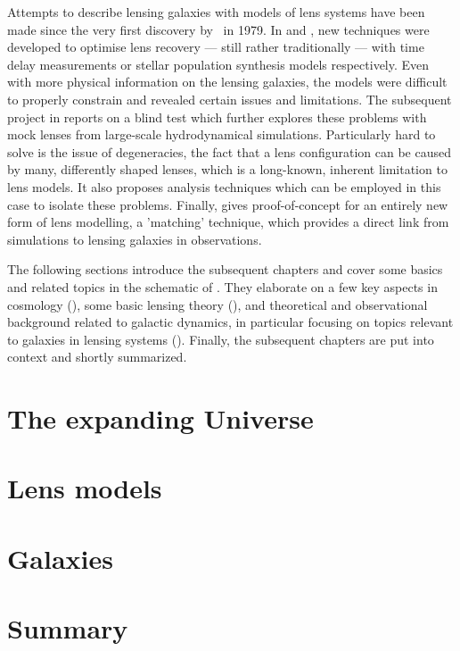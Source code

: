 Attempts to describe lensing galaxies with models of lens systems have been made
since the very first discovery by~ in 1979.  In
 and , new techniques were developed to optimise
lens recovery --- still rather traditionally --- with time delay measurements or
stellar population synthesis models respectively.  Even with more physical
information on the lensing galaxies, the models were difficult to properly
constrain and revealed certain issues and limitations.  The subsequent project
in  reports on a blind test which further explores these problems
with mock lenses from large-scale hydrodynamical simulations.  Particularly hard
to solve is the issue of degeneracies, the fact that a lens configuration can be
caused by many, differently shaped lenses, which is a long-known, inherent
limitation to lens models.  It also proposes analysis techniques which can be
employed in this case to isolate these problems.  Finally,  gives
proof-of-concept for an entirely new form of lens modelling, a 'matching'
technique, which provides a direct link from simulations to lensing galaxies in
observations.

The following sections introduce the subsequent chapters and cover some basics
and related topics in the schematic of .  They elaborate on a
few key aspects in cosmology (), some basic lensing theory
(), and theoretical and observational background related to
galactic dynamics, in particular focusing on topics relevant to galaxies in
lensing systems ().  Finally, the subsequent chapters are put
into context and shortly summarized.

\section{The expanding Universe}

\section{Lens models}

\section{Galaxies}

\section{Summary}


